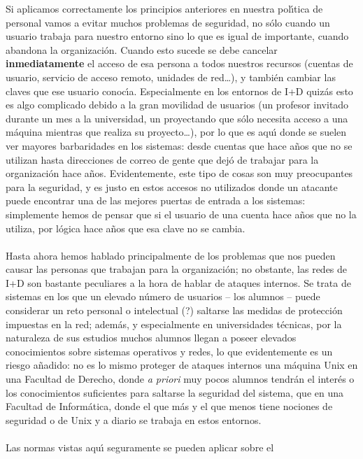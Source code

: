 Si aplicamos correctamente los principios anteriores en nuestra pol\'{\i}tica
de personal vamos a evitar muchos problemas de seguridad, no s\'olo cuando
un usuario trabaja para nuestro entorno sino lo que es igual de importante,
cuando abandona la organizaci\'on. Cuando esto sucede se debe cancelar {\bf
inmediatamente} el acceso de esa persona a todos nuestros recursos (cuentas de
usuario, servicio de acceso remoto, unidades de red\ldots), y tambi\'en 
cambiar las claves que ese usuario conoc\'{\i}a. Especialmente en los entornos 
de I+D quiz\'as
esto es algo complicado debido a la gran movilidad de usuarios (un profesor
invitado durante un mes a la universidad, un proyectando que s\'olo necesita
acceso a una m\'aquina mientras que realiza su proyecto\ldots), por lo que es
aqu\'{\i} donde se suelen ver mayores barbaridades en los sistemas: desde 
cuentas que hace a\~nos que no se utilizan hasta direcciones de correo de gente
que dej\'o de trabajar para la organizaci\'on hace a\~nos. Evidentemente, este
tipo de cosas son muy preocupantes para la seguridad, y es justo en estos
accesos no utilizados donde un atacante puede encontrar una de las mejores 
puertas de entrada a los sistemas: simplemente hemos de pensar que si el usuario
de una cuenta hace a\~nos que no la utiliza, por l\'ogica hace a\~nos que esa
clave no se cambia.\\
\\Hasta ahora hemos hablado principalmente de los problemas que nos pueden causar
las personas que trabajan para la organizaci\'on; no obstante, las redes de I+D 
son bastante peculiares a la hora de hablar de ataques internos. Se trata de 
sistemas en los que un elevado n\'umero de usuarios -- los alumnos -- puede
considerar un reto personal o intelectual (?) saltarse las medidas de 
protecci\'on impuestas en la red; adem\'as, y especialmente en universidades
t\'ecnicas, por la naturaleza de sus 
estudios muchos alumnos llegan a poseer elevados conocimientos sobre sistemas
operativos y redes, lo que evidentemente es un riesgo a\~nadido: no es lo mismo
proteger de ataques internos una m\'aquina Unix en una Facultad de Derecho, 
donde {\it a priori} muy pocos alumnos tendr\'an el inter\'es o los 
conocimientos suficientes para saltarse la seguridad del sistema, que en una 
Facultad de Inform\'atica, donde el que m\'as y el que menos tiene nociones de 
seguridad o de Unix y a diario se trabaja en estos entornos.\\
\\Las normas vistas aqu\'{\i} seguramente se pueden aplicar sobre el 
